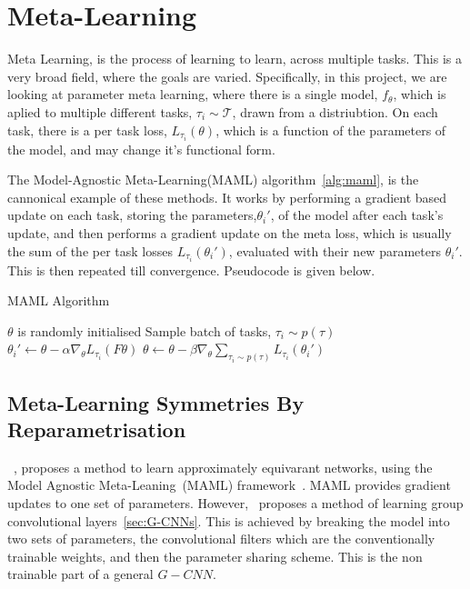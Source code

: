 \section{Meta-Learning}
Meta Learning, is the process of learning to learn, across multiple tasks. This is a very broad field, where the goals are varied. Specifically, in this project, we are looking at parameter meta learning, where there is a single model, $f_\theta$, which is aplied to multiple different tasks, $\tau_i \sim \mathcal{T}$, drawn from a distriubtion.
On each task, there is a per task loss, $L_{\tau_i}(\theta)$, which is a function of the parameters of the model, and may change it's functional form.


The Model-Agnostic Meta-Learning(MAML) algorithm~\ref{alg:maml}, is the cannonical example of these methods. It works by performing a gradient based update on each task, storing the parameters,$\theta_i'$, of the model after each task's update, and then performs a gradient update on the meta loss, which is usually the sum of the per task losses $L_{\tau_i}(\theta_i')$, evaluated with their new parameters $\theta_i'$. This is then repeated till convergence. Pseudocode is given below.


\begin{algorithm}
	\caption{MAML Algorithm}
	\label{alg:maml}
	\begin{algorithmic}
		\State $\theta$ is randomly initialised
		\State Sample batch of tasks, $\tau_i \sim p(\tau)$
		\State $\theta_i' \leftarrow \theta - \alpha \nabla_\theta L_{\tau_i}(F\theta)$
		\EndFor
		\State $\theta \leftarrow \theta - \beta \nabla_\theta \sum_{\tau_i \sim p(\tau)}{L_{\tau_i}(\theta_i')}$
		\EndWhile
	\end{algorithmic}
\end{algorithm}


\subsection{Meta-Learning Symmetries By Reparametrisation}
~\cite{zhou2020meta}, proposes a method to learn approximately equivarant networks, using the Model Agnostic Meta-Leaning~(MAML) framework~\cite{finn2017model}. MAML provides gradient updates to one set of parameters. However,~\cite{zhou2020meta} proposes a method of learning group convolutional layers~\ref{sec:G-CNNs}. This is achieved by breaking the model into two sets of parameters, the convolutional filters which are the conventionally trainable weights, and then the parameter sharing scheme. This is the non trainable part of a general $G-CNN$.

